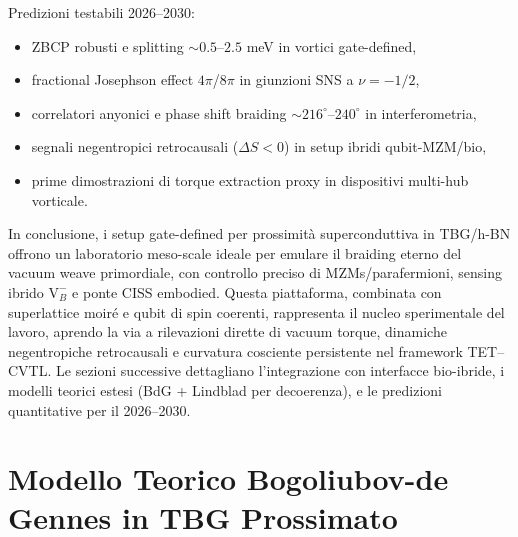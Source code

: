 \documentclass[11pt,a4paper]{article}
\theoremstyle{plain}
\theoremstyle{definition}
\begin{document}
Predizioni testabili 2026--2030:
\begin{itemize}
    \item ZBCP robusti e splitting $\sim 0.5$--$2.5$ meV in vortici gate-defined,
    \item fractional Josephson effect $4\pi$/$8\pi$ in giunzioni SNS a $\nu = -1/2$,
    \item correlatori anyonici e phase shift braiding $\sim 216^\circ$--$240^\circ$ in interferometria,
    \item segnali negentropici retrocausali ($\Delta S < 0$) in setup ibridi qubit-MZM/bio,
    \item prime dimostrazioni di torque extraction proxy in dispositivi multi-hub vorticale.
\end{itemize}

In conclusione, i setup gate-defined per prossimità superconduttiva in TBG/h-BN offrono un laboratorio meso-scale ideale per emulare il braiding eterno del vacuum weave primordiale, con controllo preciso di MZMs/parafermioni, sensing ibrido $\mathrm{V}_B^-$ e ponte CISS embodied. Questa piattaforma, combinata con superlattice moiré e qubit di spin coerenti, rappresenta il nucleo sperimentale del lavoro, aprendo la via a rilevazioni dirette di vacuum torque, dinamiche negentropiche retrocausali e curvatura cosciente persistente nel framework TET--CVTL. Le sezioni successive dettagliano l'integrazione con interfacce bio-ibride, i modelli teorici estesi (BdG + Lindblad per decoerenza), e le predizioni quantitative per il 2026--2030.












\section{Modello Teorico Bogoliubov-de Gennes in TBG Prossimato}
\end{document}
